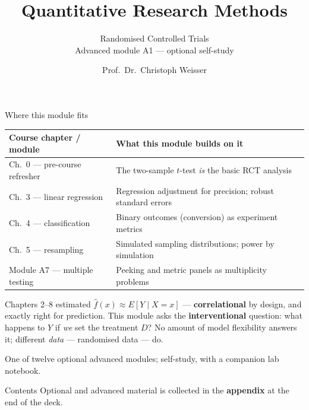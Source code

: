 \documentclass[aspectratio=169,11pt]{beamer}
\title{Quantitative Research Methods}
\subtitle{Randomised Controlled Trials\\[2pt]{\small Advanced module A1 --- optional self-study}}
\author{Prof.\ Dr.\ Christoph Weisser}
\date{}\graphicspath{{images/}}
\begin{document}
\begin{frame}[plain]\titlepage\end{frame}

\begin{frame}{Where this module fits}
  \footnotesize
  \begin{center}
  \begin{tabular}{@{}p{3.6cm}p{8.6cm}@{}}
    \toprule
    \textbf{Course chapter / module} & \textbf{What this module builds on it} \\
    \midrule
    Ch.\ 0 --- pre-course refresher & The two-sample $t$-test \emph{is} the basic RCT analysis \\
    Ch.\ 3 --- linear regression & Regression adjustment for precision; robust standard errors \\
    Ch.\ 4 --- classification & Binary outcomes (conversion) as experiment metrics \\
    Ch.\ 5 --- resampling & Simulated sampling distributions; power by simulation \\
    Module A7 --- multiple testing & Peeking and metric panels as multiplicity problems \\
    \bottomrule
  \end{tabular}
  \end{center}
  \vspace{2pt}
  \begin{takeaway}
    Chapters 2--8 estimated $\hat f(x)\approx E[Y\mid X=x]$ --- \textbf{correlational} by
    design, and exactly right for prediction. This module asks the \textbf{interventional}
    question: what happens to $Y$ if \emph{we} set the treatment $D$? No amount of model
    flexibility answers it; different \emph{data} --- randomised data --- do.
  \end{takeaway}
  {\scriptsize One of twelve optional advanced modules; self-study, with a companion lab notebook.}
\end{frame}

\begin{frame}{Contents}\small\tableofcontents[hideallsubsections]
  \vfill
  {\tiny Optional and advanced material is collected in the \textbf{appendix} at the end of the deck.}
\end{frame}
\end{document}

